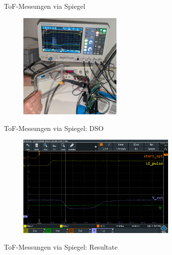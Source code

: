 \begin{frame}{ToF-Messungen via Spiegel}
    \begin{figure}
        \includegraphics[width=0.45\textwidth]{../documentation/graphics/spiegel_setup.jpg}
    \end{figure}
\end{frame}

\begin{frame}{ToF-Messungen via Spiegel: DSO}
    \begin{figure}
        \includegraphics[width=0.7\textwidth]{../documentation/graphics/spiegel_12cm_dso_ok.png}
    \end{figure}
\end{frame}

\begin{frame}{ToF-Messungen via Spiegel: Resultate}
    \begin{figure}
        
    \end{figure}
\end{frame}

